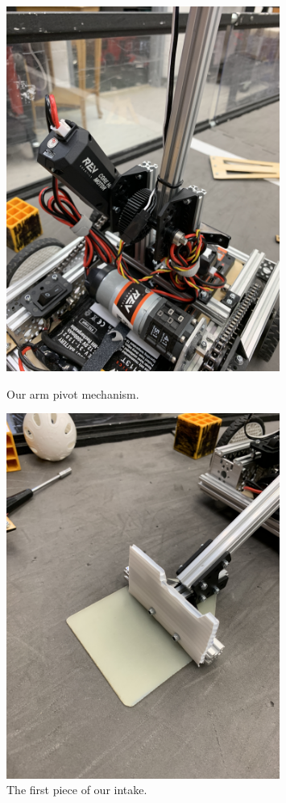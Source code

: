 \begin{figure}[ht]
\centering
\begin{minipage}[b]{.50\textwidth}
  \centering
  \includegraphics[width=0.8\textwidth]{Meetings/October/10-07-21/10-7-21_Hardware_Figure3 - Nathan Forrer.JPG}
  \caption{Our arm pivot mechanism.}
  \label{fig:pic3}
\end{minipage}%
\hfill%
\begin{minipage}[b]{.50\textwidth}
  \centering
  \includegraphics[width=0.8\textwidth]{Meetings/October/10-07-21/10-7-21_Hardware_Figure4 - Nathan Forrer.JPG}
  \caption{The first piece of our intake.}
  \label{fig:pic4}
\end{minipage}
\end{figure}